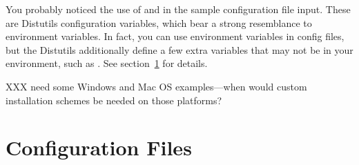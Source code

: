 \documentclass{howto}
\begin{document}
You probably noticed the use of  and  in the
sample configuration file input.  These are Distutils configuration
variables, which bear a strong resemblance to environment variables.  In
fact, you can use environment variables in config files, but the
Distutils additionally define a few extra variables that may not be in
your environment, such as .  See
section~\ref{sec:config-files} for details.

XXX need some Windows and Mac OS examples---when would custom
installation schemes be needed on those platforms?



\section{Configuration Files}
\label{sec:config-files}

\comingsoon
\end{document}
